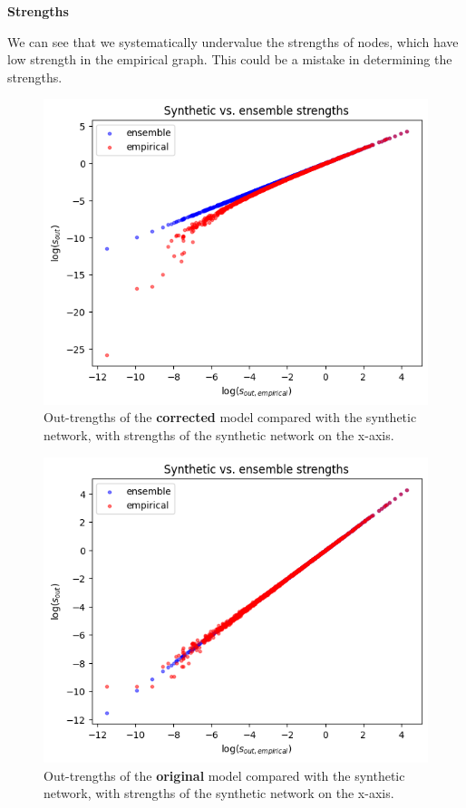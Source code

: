 \documentclass{article}
\begin{document}
\clearpage
\textbf{Strengths}

We can see that we systematically undervalue the strengths of nodes, which have low strength in the empirical graph. {\color{red} This could be a mistake in determining the strengths.}
\begin{figure}[!ht]
    \centering
    \includegraphics[scale=0.5]{img/metropolis/corrected model/s_vs_s.png}
    \caption{Out-trengths of the \textbf{corrected} model compared with the synthetic network, with strengths of the synthetic network on the x-axis.}
\end{figure}\begin{figure}[!ht]
    \centering
    \includegraphics[scale=0.5]{img/metropolis/vanilla model/s_vs_s.png}
    \caption{Out-trengths of the \textbf{original} model compared with the synthetic network, with strengths of the synthetic network on the x-axis.}
\end{figure}
\end{document}

